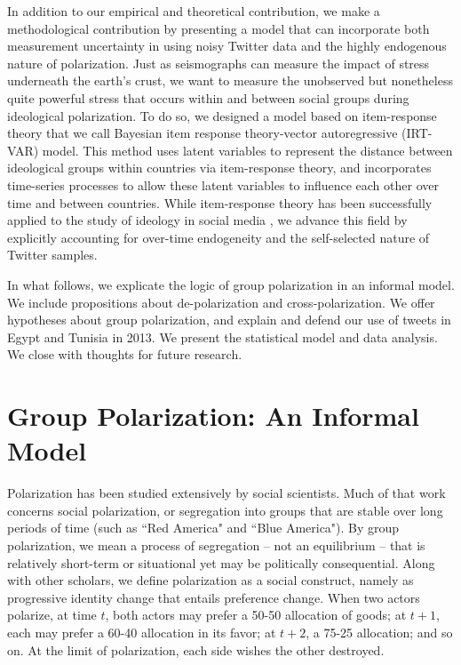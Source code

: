 \documentclass[12pt]{article}
\begin{document}
In addition to our empirical and theoretical contribution, we make a methodological contribution by presenting a model that can incorporate both measurement uncertainty in using noisy Twitter data and the highly endogenous nature of polarization. Just as seismographs can measure the impact of stress underneath the earth's crust, we want to measure the unobserved but nonetheless quite powerful stress that occurs within and between social groups during ideological polarization. To do so, we designed a model based on item-response theory that we call Bayesian item response theory-vector autoregressive (IRT-VAR) model. This method uses latent variables to represent the distance between ideological groups within countries via item-response theory, and incorporates time-series processes to allow these latent variables to influence each other over time and between countries. While item-response theory has been successfully applied to the study of ideology in social media \parencite{barbera2015}, we advance this field by explicitly accounting for over-time endogeneity and the self-selected nature of Twitter samples.

In what follows, we explicate the logic of group polarization in an informal model.  We include propositions about de-polarization and cross-polarization.  We offer hypotheses about group polarization, and explain and defend our use of tweets in Egypt and Tunisia in 2013.  We present the statistical model and data analysis.  We close with thoughts for future research.


\section*{Group Polarization: An Informal Model}
Polarization has been studied extensively by social scientists.  Much of that work concerns social polarization, or segregation into groups that are stable over long periods of time (such as ``Red America" and ``Blue America").   By group polarization, we mean a process of segregation – not an equilibrium – that is relatively short-term or situational yet may be politically consequential.   Along with other scholars, we define polarization as a social construct, namely as progressive identity change that entails preference change.   When two actors polarize, at time $t$, both actors may prefer a 50-50 allocation of goods; at $t+1$, each may prefer a 60-40 allocation in its favor; at $t+2$, a 75-25 allocation; and so on.  At the limit of polarization, each side wishes the other destroyed.   
\end{document}
